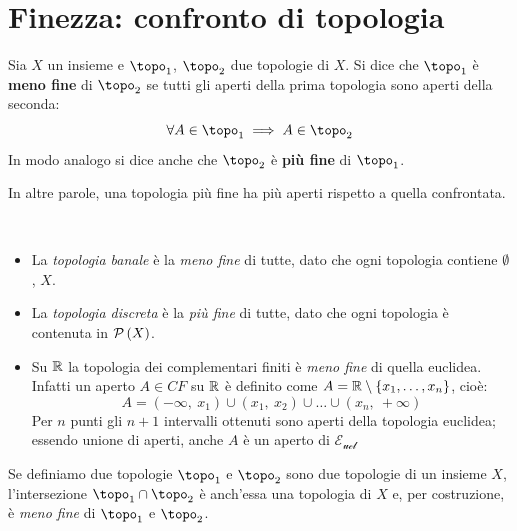 \section{Finezza: confronto di topologia}
\begin{define}
Sia $X$ un insieme e $\topo_1$, $\topo_2$ due topologie di $X$. Si dice che $\topo_1$ è \textbf{meno fine} di $\topo_2$ se tutti gli aperti della prima topologia sono aperti della seconda:
\begin{equation}
\forall A\in\topo_1\implies A\in \topo_2
\end{equation}
In modo analogo si dice anche che $\topo_2$ è \textbf{più fine} di $\topo_1$.
\end{define}
In altre parole, una topologia più fine ha più aperti rispetto a quella confrontata.
\begin{example}~{}
\begin{itemize}
\item La \textit{topologia banale} è la \textit{meno fine} di tutte, dato che ogni topologia contiene $\emptyset$, $X$.
\item La \textit{topologia discreta} è la \textit{più fine} di tutte, dato che ogni topologia è contenuta in $\mathcal{P}\left(X\right)$.
\item Su $\mathbb{R}$ la topologia dei complementari finiti è \textit{meno fine} di quella euclidea. Infatti un aperto $A\in CF$ su $\mathbb{R}$ è definito come $A=\mathbb{R}\setminus\left\{x_1,\ldots,x_n\right\}$, cioè:
\begin{equation*}
A=\left(-\infty,\ x_1\right)\cup\left(x_1,\ x_2\right)\cup\ldots\cup\left(x_n,\ +\infty\right)
\end{equation*}
Per $n$ punti gli $n+1$ intervalli ottenuti sono aperti della topologia euclidea; essendo unione di aperti, anche $A$ è un aperto di $\mathcal{E_{ucl}}$
\end{itemize}
\end{example}
\begin{observe}\label{intersezionetopo}
	Se definiamo due topologie $\topo_1$ e $\topo_2$ sono due topologie di un insieme $X$, l'intersezione $\topo_1\cap\topo_2$ è anch'essa una topologia di $X$ e, per costruzione, è \textit{meno fine} di $\topo_1$ e $\topo_2$.
\end{observe}
